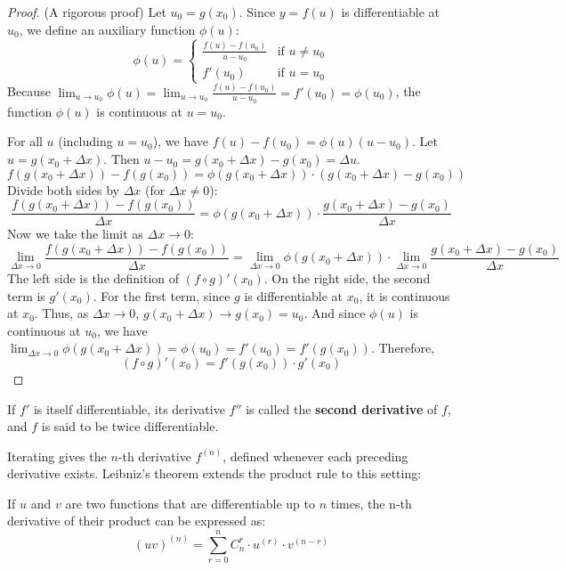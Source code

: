 \begin{proof}
(A rigorous proof)
Let $u_0 = g(x_0)$. Since $y=f(u)$ is differentiable at $u_0$, we define an auxiliary function $\phi(u)$:
\[
\phi(u) = \begin{cases}
    \frac{f(u) - f(u_0)}{u - u_0} & \text{if } u \neq u_0 \\
    f'(u_0) & \text{if } u = u_0
\end{cases}
\]
Because $\lim_{u \to u_0} \phi(u) = \lim_{u \to u_0} \frac{f(u) - f(u_0)}{u - u_0} = f'(u_0) = \phi(u_0)$, the function $\phi(u)$ is continuous at $u=u_0$.

For all $u$ (including $u=u_0$), we have $f(u) - f(u_0) = \phi(u)(u - u_0)$.
Let $u = g(x_0 + \Delta x)$. Then $u - u_0 = g(x_0 + \Delta x) - g(x_0) = \Delta u$.
\[
f(g(x_0 + \Delta x)) - f(g(x_0)) = \phi(g(x_0 + \Delta x)) \cdot (g(x_0 + \Delta x) - g(x_0))
\]
Divide both sides by $\Delta x$ (for $\Delta x \neq 0$):
\[
\frac{f(g(x_0 + \Delta x)) - f(g(x_0))}{\Delta x} = \phi(g(x_0 + \Delta x)) \cdot \frac{g(x_0 + \Delta x) - g(x_0)}{\Delta x}
\]
Now we take the limit as $\Delta x \to 0$:
\[
\lim_{\Delta x \to 0} \frac{f(g(x_0 + \Delta x)) - f(g(x_0))}{\Delta x} = \lim_{\Delta x \to 0} \phi(g(x_0 + \Delta x)) \cdot \lim_{\Delta x \to 0} \frac{g(x_0 + \Delta x) - g(x_0)}{\Delta x}
\]
The left side is the definition of $(f \circ g)'(x_0)$.
On the right side, the second term is $g'(x_0)$.
For the first term, since $g$ is differentiable at $x_0$, it is continuous at $x_0$. Thus, as $\Delta x \to 0$, $g(x_0 + \Delta x) \to g(x_0) = u_0$.
And since $\phi(u)$ is continuous at $u_0$, we have $\lim_{\Delta x \to 0} \phi(g(x_0 + \Delta x)) = \phi(u_0) = f'(u_0) = f'(g(x_0))$.
Therefore,
\[
(f \circ g)'(x_0) = f'(g(x_0)) \cdot g'(x_0)
\]
\end{proof}


\begin{definition}
If $f'$ is itself differentiable, its derivative $f''$ is called the \textbf{second derivative} of $f$, and $f$ is said to be twice differentiable.
\end{definition}

Iterating gives the $n$-th derivative $f^{(n)}$, defined whenever each preceding derivative exists. Leibniz's theorem extends the product rule to this setting:

\begin{theorem}
If $u$ and $v$ are two functions that are differentiable up to $n$ times, the n-th derivative of their product can be expressed as:
\[
(uv)^{(n)}=\sum_{r=0}^{n} C_{n}^{r}\cdot u^{(r)}\cdot v^{(n-r)}
\]

\end{theorem}

